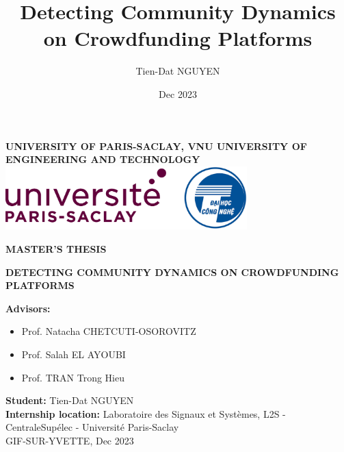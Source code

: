 \title{Detecting Community Dynamics on Crowdfunding Platforms}
\author{Tien-Dat NGUYEN}
\date{Dec 2023}

\begin{titlepage}
	\centering
	\vspace*{1cm}

	{\Large \textbf{UNIVERSITY OF PARIS-SACLAY, VNU UNIVERSITY OF ENGINEERING AND TECHNOLOGY}}\\[1cm]

	\includegraphics[width=0.7\textwidth]{images/logo_combine.png}
	\vspace*{4cm}


	{\Large \textbf{MASTER'S THESIS}}\\[0.5cm]

	{\Huge \textbf{DETECTING COMMUNITY DYNAMICS ON CROWDFUNDING PLATFORMS} \par}
	\vspace*{2cm}
	{\large \textbf{Advisors:}}
	\begin{large}
		\begin{itemize}
			\item Prof. Natacha CHETCUTI-OSOROVITZ
			\item Prof. Salah EL AYOUBI
			\item Prof. TRAN Trong Hieu
		\end{itemize}
	\end{large}
	\vspace*{1cm}
	{\large \textbf{Student:} Tien-Dat NGUYEN}\\[0.5cm]

	{\large \textbf{Internship location:} Laboratoire des Signaux et Systèmes, L2S - CentraleSupélec - Université Paris-Saclay}\\[0.25cm]

	{\large GIF-SUR-YVETTE, Dec 2023 }\\[0.25cm]


	\vfill
\end{titlepage}